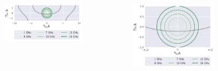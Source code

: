 \documentclass{beamer}
\begin{document}
\begin{frame}
\begin{columns}[c]
				\begin{figure}[h]
					\includegraphics[width=\textwidth]{intro_electro/TE-tan-implicito}
				\end{figure}
				\begin{figure}[h]
					\includegraphics[width=\textwidth]{intro_electro/TE-tan-implicito-zoom}
				\end{figure}
			\end{columns}
		\end{frame}
	
\end{document}
